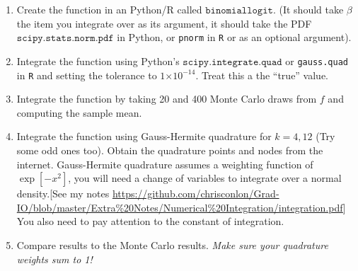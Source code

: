 \documentclass{article}
\providecommand{\e}[1]{\ensuremath{\times 10^{#1}}}
\begin{document}
 
\begin{enumerate}
\item Create the function in an Python/R called $\mathtt{binomiallogit}$. (It should take $\beta$ the item you integrate over as its argument, it should take the PDF $\mathtt{scipy.stats.norm.pdf}$ in Python, or \texttt{pnorm} in \texttt{R} or  as an optional argument).

\item Integrate the function using Python's $\mathtt{scipy.integrate.quad}$ or \texttt{gauss.quad} in \texttt{R} and setting the tolerance to $1\e{-14}$.  Treat this a the ``true'' value.
\begin{comment}
\begin{verbatim}
[Ftrue,nevals]=quad(@binomiallogit,-10,10,1e-14);
z=randn(100,1);
Fmc=sum(binomiallogitnopdf(z))./length(z);
Fgh=binomiallogitnopdf(x)'*(w./sum(w));
\end{verbatim}
\end{comment}

\item Integrate the function by taking 20 and 400 Monte Carlo draws from $f$ and computing the sample mean.
\item Integrate the function using Gauss-Hermite quadrature for $k=4, 12$ (Try some odd ones too). Obtain the quadrature points and nodes from the internet. Gauss-Hermite quadrature assumes a weighting function of $\exp[-x^2]$, you will need a change of variables to integrate over a normal density.[See my notes \url{https://github.com/chrisconlon/Grad-IO/blob/master/Extra%20Notes/Numerical%20Integration/integration.pdf}] You also need to pay attention to the constant of integration.
\item Compare results to the Monte Carlo results. \textit{Make sure your quadrature weights sum to 1!}


\begin{comment}
\begin{table}[htdp]
\caption{True value: 0.5515}
\begin{center}
\begin{tabular}{l r r r }
Method & Points & Error\\
quad & 2597 & 1e-14 \\
monte carlo & 100 & 0.0166\\
Gauss Hermite & 4 & 0.0044234\\
Gauss Hermite & 12 & 0.0044469\\
\end{tabular}
\end{center}
\end{table}
\end{comment}


\end{enumerate}
\end{document}
